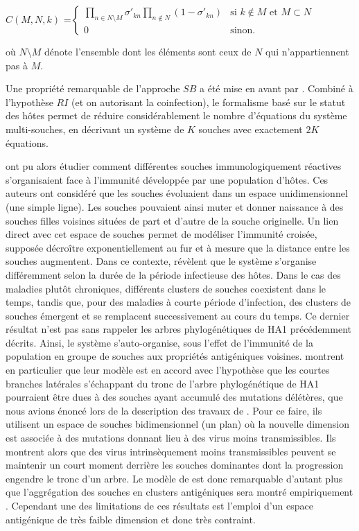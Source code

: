 $C(M,N,k)$ =$
\begin{cases}
  \prod_{n \in N \setminus M} \sigma'_{kn} \prod_{n \notin N}
  (1-\sigma'_{kn}) & \text{si } k \notin M \text{ et } M \subset N \\
  0 & \text{sinon.}
\end{cases}$ 

où $N \setminus M$ dénote l'ensemble dont les éléments sont ceux de $N$ qui n'appartiennent pas à $M$. 


Une propriété remarquable de l'approche $SB$ a été mise en avant par
\citet{Gog2002}. Combiné à l'hypothèse $RI$ (et on autorisant la
coinfection), le formalisme basé sur le statut des hôtes permet de
réduire considérablement le nombre d'équations du système
multi-souches, en décrivant un système de $K$ souches avec exactement
$2K$ équations.

\citet{Gog2002} ont pu alors étudier comment différentes souches
immunologiquement réactives s'organisaient face à l'immunité
développée par une population d'hôtes. Ces auteurs ont considéré que
les souches évoluaient dans un espace unidimensionnel (une simple
ligne). Les souches pouvaient ainsi muter et donner naissance à des
souches filles voisines situées de part et d'autre de la souche
originelle. Un lien direct avec cet espace de souches permet de
modéliser l'immunité croisée, supposée décroître exponentiellement au
fur et à mesure que la distance entre les souches augmentent. Dans ce
contexte, \citet{Gog2002} révèlent que le système s'organise
différemment selon la durée de la période infectieuse des hôtes. Dans
le cas des maladies plutôt chroniques, différents clusters de souches
coexistent dans le temps, tandis que, pour des maladies à courte
période d'infection, des clusters de souches émergent et se remplacent
successivement au cours du temps. Ce dernier résultat n'est pas sans
rappeler les arbres phylogénétiques de HA1 précédemment décrits.
Ainsi, le système s'auto-organise, sous l'effet de l'immunité de la
population en groupe de souches aux propriétés antigéniques voisines.
\citet{Gog2002} montrent en particulier que leur modèle est en accord
avec l'hypothèse que les courtes branches latérales s'échappant du
tronc de l'arbre phylogénétique de HA1 pourraient être dues à des
souches ayant accumulé des mutations délétères, que nous avions énoncé
lors de la description des travaux de \citet{Fitch1997}. Pour ce
faire, ils utilisent un espace de souches bidimensionnel (un plan) où
la nouvelle dimension est associée à des mutations donnant lieu à des
virus moins transmissibles. Ils montrent alors que des virus
intrinsèquement moins transmissibles peuvent se maintenir un court
moment derrière les souches dominantes dont la progression engendre le
tronc d'un arbre. Le modèle de \citet{Gog2002} est donc remarquable
d'autant plus que l'aggrégation des souches en clusters antigéniques
sera montré empiriquement \citep{Plotkin2002, Smith2004}. Cependant
une des limitations de ces résultats est l'emploi d'un espace
antigénique de très faible dimension et donc très contraint.

